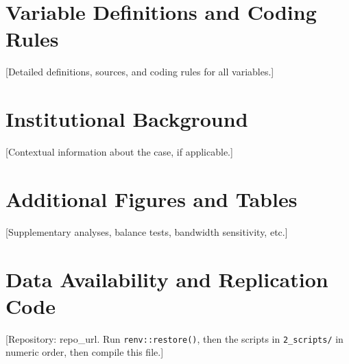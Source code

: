 \documentclass[12pt,a4paper]{article}
\begin{document}
\newpage
\printbibliography

\newpage
\appendix
\section{Variable Definitions and Coding Rules}\label{app:variables}
[Detailed definitions, sources, and coding rules for all variables.]

\section{Institutional Background}\label{app:background}
[Contextual information about the case, if applicable.]

\section{Additional Figures and Tables}\label{app:additional}
[Supplementary analyses, balance tests, bandwidth sensitivity, etc.]

\section{Data Availability and Replication Code}\label{app:replication}
[Repository: {{repo_url}}. Run \texttt{renv::restore()}, then the scripts in \texttt{2\_scripts/} in numeric order, then compile this file.]
\end{document}
